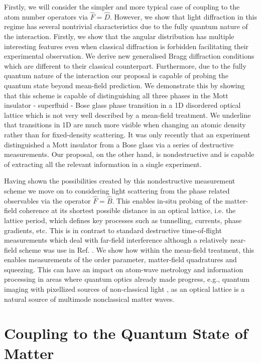 Firstly, we will consider the simpler and more typical case of
coupling to the atom number operators via $\hat{F} =
\hat{D}$. However, we show that light diffraction in this regime has
several nontrivial characteristics due to the fully quantum nature of
the interaction. Firstly, we show that the angular distribution has
multiple interesting features even when classical diffraction is
forbidden facilitating their experimental observation. We derive new
generalised Bragg diffraction conditions which are different to their
classical counterpart. Furthermore, due to the fully quantum nature of
the interaction our proposal is capable of probing the quantum state
beyond mean-field prediction. We demonstrate this by showing that this
scheme is capable of distinguishing all three phases in the Mott
insulator - superfluid - Bose glass phase transition in a 1D
disordered optical lattice which is not very well described by a
mean-field treatment. We underline that transitions in 1D are much
more visible when changing an atomic density rather than for
fixed-density scattering. It was only recently that an experiment
distinguished a Mott insulator from a Bose glass \cite{derrico2014}
via a series of destructive measurements. Our proposal, on the other
hand, is nondestructive and is capable of extracting all the relevant
information in a single experiment.

Having shown the possibilities created by this nondestructive
measurement scheme we move on to considering light scattering from the
phase related observables via the operator $\hat{F} = \hat{B}$. This
enables in-situ probing of the matter-field coherence at its shortest
possible distance in an optical lattice, i.e. the lattice period,
which defines key processes such as tunnelling, currents, phase
gradients, etc. This is in contrast to standard destructive
time-of-flight measurements which deal with far-field interference
although a relatively near-field scheme was use in
Ref. \cite{miyake2011}. We show how within the mean-field treatment,
this enables measurements of the order parameter, matter-field
quadratures and squeezing. This can have an impact on atom-wave
metrology and information processing in areas where quantum optics
already made progress, e.g., quantum imaging with pixellized sources
of non-classical light \cite{golubev2010, kolobov1999}, as an optical
lattice is a natural source of multimode nonclassical matter waves.

\section{Coupling to the Quantum State of Matter}


